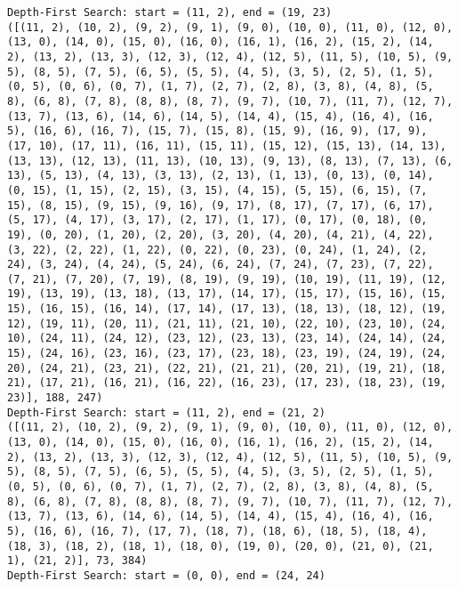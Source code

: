 \documentclass[12pt]{article}
\begin{document}
\begin{lstlisting}[breaklines=true]
Depth-First Search: start = (11, 2), end = (19, 23)
([(11, 2), (10, 2), (9, 2), (9, 1), (9, 0), (10, 0), (11, 0), (12, 0), (13, 0), (14, 0), (15, 0), (16, 0), (16, 1), (16, 2), (15, 2), (14, 2), (13, 2), (13, 3), (12, 3), (12, 4), (12, 5), (11, 5), (10, 5), (9, 5), (8, 5), (7, 5), (6, 5), (5, 5), (4, 5), (3, 5), (2, 5), (1, 5), (0, 5), (0, 6), (0, 7), (1, 7), (2, 7), (2, 8), (3, 8), (4, 8), (5, 8), (6, 8), (7, 8), (8, 8), (8, 7), (9, 7), (10, 7), (11, 7), (12, 7), (13, 7), (13, 6), (14, 6), (14, 5), (14, 4), (15, 4), (16, 4), (16, 5), (16, 6), (16, 7), (15, 7), (15, 8), (15, 9), (16, 9), (17, 9), (17, 10), (17, 11), (16, 11), (15, 11), (15, 12), (15, 13), (14, 13), (13, 13), (12, 13), (11, 13), (10, 13), (9, 13), (8, 13), (7, 13), (6, 13), (5, 13), (4, 13), (3, 13), (2, 13), (1, 13), (0, 13), (0, 14), (0, 15), (1, 15), (2, 15), (3, 15), (4, 15), (5, 15), (6, 15), (7, 15), (8, 15), (9, 15), (9, 16), (9, 17), (8, 17), (7, 17), (6, 17), (5, 17), (4, 17), (3, 17), (2, 17), (1, 17), (0, 17), (0, 18), (0, 19), (0, 20), (1, 20), (2, 20), (3, 20), (4, 20), (4, 21), (4, 22), (3, 22), (2, 22), (1, 22), (0, 22), (0, 23), (0, 24), (1, 24), (2, 24), (3, 24), (4, 24), (5, 24), (6, 24), (7, 24), (7, 23), (7, 22), (7, 21), (7, 20), (7, 19), (8, 19), (9, 19), (10, 19), (11, 19), (12, 19), (13, 19), (13, 18), (13, 17), (14, 17), (15, 17), (15, 16), (15, 15), (16, 15), (16, 14), (17, 14), (17, 13), (18, 13), (18, 12), (19, 12), (19, 11), (20, 11), (21, 11), (21, 10), (22, 10), (23, 10), (24, 10), (24, 11), (24, 12), (23, 12), (23, 13), (23, 14), (24, 14), (24, 15), (24, 16), (23, 16), (23, 17), (23, 18), (23, 19), (24, 19), (24, 20), (24, 21), (23, 21), (22, 21), (21, 21), (20, 21), (19, 21), (18, 21), (17, 21), (16, 21), (16, 22), (16, 23), (17, 23), (18, 23), (19, 23)], 188, 247)
Depth-First Search: start = (11, 2), end = (21, 2)
([(11, 2), (10, 2), (9, 2), (9, 1), (9, 0), (10, 0), (11, 0), (12, 0), (13, 0), (14, 0), (15, 0), (16, 0), (16, 1), (16, 2), (15, 2), (14, 2), (13, 2), (13, 3), (12, 3), (12, 4), (12, 5), (11, 5), (10, 5), (9, 5), (8, 5), (7, 5), (6, 5), (5, 5), (4, 5), (3, 5), (2, 5), (1, 5), (0, 5), (0, 6), (0, 7), (1, 7), (2, 7), (2, 8), (3, 8), (4, 8), (5, 8), (6, 8), (7, 8), (8, 8), (8, 7), (9, 7), (10, 7), (11, 7), (12, 7), (13, 7), (13, 6), (14, 6), (14, 5), (14, 4), (15, 4), (16, 4), (16, 5), (16, 6), (16, 7), (17, 7), (18, 7), (18, 6), (18, 5), (18, 4), (18, 3), (18, 2), (18, 1), (18, 0), (19, 0), (20, 0), (21, 0), (21, 1), (21, 2)], 73, 384)
Depth-First Search: start = (0, 0), end = (24, 24)

\end{lstlisting}
\end{document}

